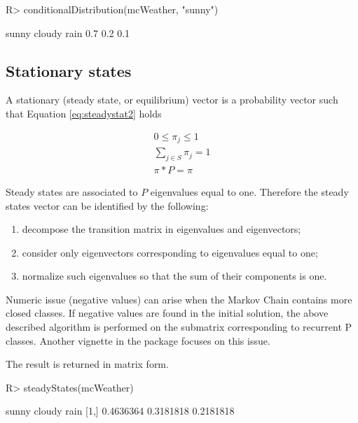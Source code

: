 \documentclass[
  nojss]{jss}
\providecommand{\tightlist}{%
  \setlength{\itemsep}{0pt}\setlength{\parskip}{0pt}}
\begin{document}
\begin{CodeChunk}

\begin{CodeInput}
R> conditionalDistribution(mcWeather, "sunny")
\end{CodeInput}

\begin{CodeOutput}
 sunny cloudy   rain 
   0.7    0.2    0.1 
\end{CodeOutput}
\end{CodeChunk}

\hypertarget{stationary-states}{%
\subsection{Stationary states}\label{stationary-states}}

A stationary (steady state, or equilibrium) vector is a probability vector such that Equation \ref{eq:steadystat2} holds

\begin{equation}
\begin{matrix}
0\leq \pi_j \leq 1\\ 
\sum_{j \in S} \pi_j=1\\ 
\pi*P=\pi
\end{matrix}
\label{eq:steadystat2}
\end{equation}

Steady states are associated to \(P\) eigenvalues equal to one. Therefore the steady states vector can be identified by the following:

\begin{enumerate}
\def\labelenumi{\arabic{enumi}.}
\tightlist
\item
  decompose the transition matrix in eigenvalues and eigenvectors;
\item
  consider only eigenvectors corresponding to eigenvalues equal to one;
\item
  normalize such eigenvalues so that the sum of their components is one.
\end{enumerate}

Numeric issue (negative values) can arise when the Markov Chain contains more closed classes. If negative values are found in the initial solution, the above described algorithm is performed on the submatrix corresponding to recurrent P classes. Another vignette in the package focuses on this issue.

The result is returned in matrix form.

\begin{CodeChunk}

\begin{CodeInput}
R> steadyStates(mcWeather)
\end{CodeInput}

\begin{CodeOutput}
         sunny    cloudy      rain
[1,] 0.4636364 0.3181818 0.2181818
\end{CodeOutput}
\end{CodeChunk}
\end{document}
